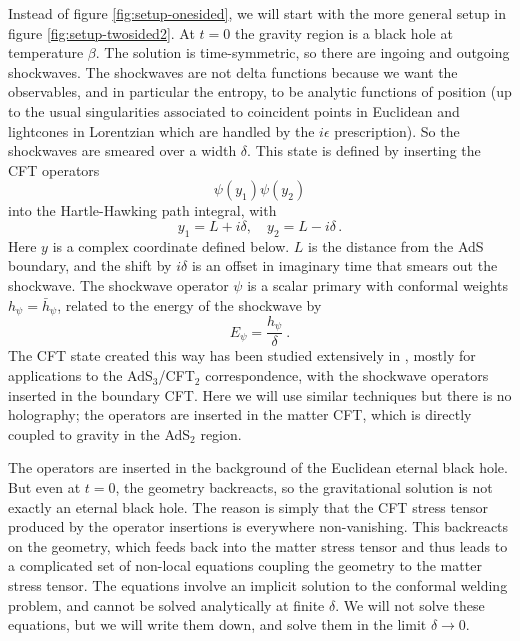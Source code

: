 \documentclass[11pt,oneside,letterpaper]{article}
\newcommand{\be}{\begin{equation}}
\newcommand{\ee}{\end{equation}}
\def\be{\begin{eqnarray}}
\def\ee{\end{eqnarray}}
\def\be{\begin{equation}}
\def\ee{\end{equation}}
\numberwithin{equation}{section}
\def\d{{\delta}}
\def\be{\begin{equation}}
\def\ee{\end{equation}}
\def\q{\quad}
\def \be {\begin{equation}}
\def \ee {\end{equation}}
\newcommand{\bh}{\bar{h}}
\begin{document}
\begin{spacing}{1.1}
Instead of figure \ref{fig:setup-onesided}, we will start with the more general setup in figure \ref{fig:setup-twosided2}. At $t=0$ the gravity region is a black hole at temperature $\beta$. The solution is time-symmetric, so there are ingoing and outgoing shockwaves. The shockwaves are not delta functions because we want the observables, and in particular the entropy, to be analytic functions of position (up to the usual singularities associated to coincident points in Euclidean and lightcones in Lorentzian which are handled by the $i\epsilon$ prescription). So the shockwaves are smeared over a width $\delta$. This  state is defined by inserting the CFT operators
\be
\psi(y_1) \psi(y_2)
\ee
into the Hartle-Hawking path integral, with
\be
y_1 =L+i\d,\q  y_2 = L-i\d\, .
\ee
Here $y$ is a complex coordinate defined below. $L$ is the distance from the AdS boundary, and the shift by $i\delta$ is an offset in imaginary time that smears out the shockwave.
The shockwave operator $\psi$ is a scalar primary with conformal weights $h_\psi = \bh_\psi$, related to the energy of the shockwave by
\be
E_\psi =  \frac{h_\psi}{\delta} \ .
\ee
The CFT state created this way has been studied extensively in \cite{Nozaki:2014hna,Asplund:2014coa,Roberts:2014ifa,Hartman:2015lfa,Caputa:2015waa,Anous:2016kss,Afkhami-Jeddi:2017rmx}, mostly for applications to the AdS$_3$/CFT$_2$ correspondence, with the shockwave operators inserted in the boundary CFT. Here we will use similar techniques but there is no holography; the operators are inserted in the matter CFT, which is directly coupled to gravity in the AdS$_2$ region.

The operators are inserted in the background of the Euclidean eternal black hole. But even at $t=0$, the geometry backreacts, so the gravitational solution is not exactly an eternal black hole. The reason is simply that the CFT stress tensor produced by the operator insertions is everywhere non-vanishing. This backreacts on the geometry, which feeds back into the matter stress tensor and thus leads to a complicated set of non-local equations coupling the geometry to the matter stress tensor. The equations involve an implicit solution to the conformal welding problem, and cannot be solved analytically at finite $\delta$. We will not solve these equations, but we will write them down, and solve them in the limit $\delta \to 0$.


\end{spacing}
\end{document}
